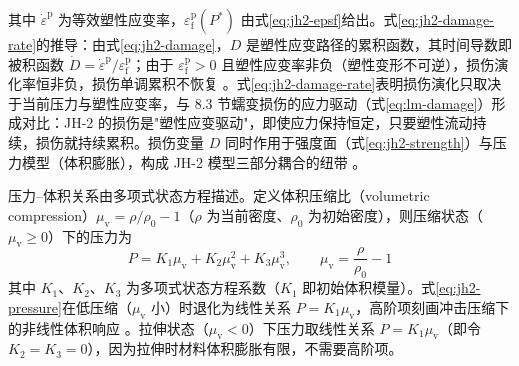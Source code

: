其中 $\dot{\varepsilon}^{\mathrm{p}}$ 为等效塑性应变率，$\varepsilon^{\mathrm{p}}_{\mathrm{f}}(P^{*})$ 由式\eqref{eq:jh2-epsf}给出。式\eqref{eq:jh2-damage-rate}的推导：由式\eqref{eq:jh2-damage}，$D$ 是塑性应变路径的累积函数，其时间导数即被积函数 $\dot{D}=\dot{\varepsilon}^{\mathrm{p}}/\varepsilon^{\mathrm{p}}_{\mathrm{f}}$；由于 $\varepsilon^{\mathrm{p}}_{\mathrm{f}}>0$ 且塑性应变率非负（塑性变形不可逆），损伤演化率恒非负，损伤单调累积不恢复 \cite{JohnsonHolmquist1994}。式\eqref{eq:jh2-damage-rate}表明损伤演化只取决于当前压力与塑性应变率，与 8.3 节蠕变损伤的应力驱动（式\eqref{eq:lm-damage}）形成对比：JH-2 的损伤是"塑性应变驱动"，即使应力保持恒定，只要塑性流动持续，损伤就持续累积。损伤变量 $D$ 同时作用于强度面（式\eqref{eq:jh2-strength}）与压力模型（体积膨胀），构成 JH-2 模型三部分耦合的纽带 \cite{JohnsonHolmquist1994}。

压力--体积关系由多项式状态方程描述。定义体积压缩比（volumetric compression）$\mu_{\mathrm{v}}=\rho/\rho_{0}-1$（$\rho$ 为当前密度、$\rho_{0}$ 为初始密度），则压缩状态（$\mu_{\mathrm{v}}\ge0$）下的压力为
\begin{equation}
  P=K_{1}\mu_{\mathrm{v}}+K_{2}\mu_{\mathrm{v}}^{2}+K_{3}\mu_{\mathrm{v}}^{3},
  \qquad \mu_{\mathrm{v}}=\frac{\rho}{\rho_{0}}-1
  \label{eq:jh2-pressure}
\end{equation}
其中 $K_{1}$、$K_{2}$、$K_{3}$ 为多项式状态方程系数（$K_{1}$ 即初始体积模量）。式\eqref{eq:jh2-pressure}在低压缩（$\mu_{\mathrm{v}}$ 小）时退化为线性关系 $P=K_{1}\mu_{\mathrm{v}}$，高阶项刻画冲击压缩下的非线性体积响应 \cite{JohnsonHolmquist1994}。拉伸状态（$\mu_{\mathrm{v}}<0$）下压力取线性关系 $P=K_{1}\mu_{\mathrm{v}}$（即令 $K_{2}=K_{3}=0$），因为拉伸时材料体积膨胀有限，不需要高阶项。


